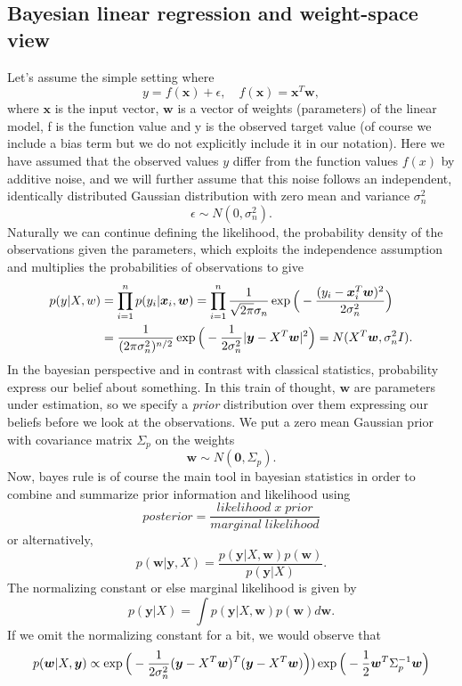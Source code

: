 \documentclass[12pt,a4paper,oneside]{book}
\theoremstyle{plain}
\theoremstyle{definition}
\begin{document}
{\subsection{Bayesian linear regression and weight-space view}
Let's assume the simple setting where $$y=f(\bm{x})+ \epsilon, \quad f(\bm{x})=\bm{x}^{T}\bm{w},$$ where $\bm{x}$ is the input vector, $\bm{w}$ is a vector of weights (parameters) of the linear model, f is the function value and y is the observed target value (of course we include a bias term but we do not explicitly include it in our notation). Here we have assumed that the observed values $y$ differ from the function values $f(x)$ by additive noise, and we will further assume that this noise follows an independent, identically distributed Gaussian distribution with zero mean and variance $\sigma_n^2$ $$\epsilon\sim N (0,\sigma_n^2).$$ Naturally we can continue defining the likelihood, the probability density of the observations given the parameters, which exploits the independence assumption and multiplies the probabilities of observations to give 
\begin{align*}
p(y|X,w)&=\prod_{i=1}^n p(y_i|\bm{x}_i,\bm{w})=\prod_{i=1}^n \frac{1}{\sqrt{2\pi}\sigma_n}\exp\Big{(}-\frac{(y_i-\bm{x}_i^{T}\bm{w})^2}{2\sigma_n^2}\Big{)}\\&=\frac{1}{(2\pi \sigma_n^2)^{n/2}}\exp \Big{(}-\frac{1}{2\sigma_n^2}|\bm{y}-X^T \bm{w}|^2\Big{)}=N(X^T\bm{w},\sigma_n^2 I).
\end{align*}
In the bayesian perspective and in contrast with classical statistics, probability express our belief about something. In this train of thought, $\bm{w}$ are parameters under estimation, so we specify a \textit{prior} distribution over them expressing our beliefs before we look at the observations. We put a zero mean Gaussian prior with covariance matrix $\Sigma_p$ on the weights $$\bm{w}\sim N(\bm{0},\Sigma_p).$$ Now, bayes rule is of course the main tool in bayesian statistics in order to combine and summarize prior information and likelihood using $$posterior=\frac{likelihood\;x\; prior}{marginal\;likelihood}$$ 
or alternatively, $$p(\bm{w}|\bm{y},X)=\frac{p(\bm{y}|X,\bm{w})p(\bm{w})}{p(\bm{y}|X)}.$$ The normalizing constant or else marginal likelihood is given by $$p(\bm{y}|X)=\int p(\bm{y}|X,\bm{w})p(\bm{w})d\bm{w}.$$ If we omit the normalizing constant for a bit, we would observe that 
\begin{align*}
p(\bm{w}|X,\bm{y})&\propto \exp\Big{(}-\frac{1}{2\sigma_n^2}(\bm{y}-X^T\bm{w})^T(\bm{y}-X^T\bm{w})\Big{)})\exp\Big{(}-\frac{1}{2}\bm{w}^T\Sigma_p^{-1}\bm{w}\Big{)}\\

\end{align*}}
\end{document}
